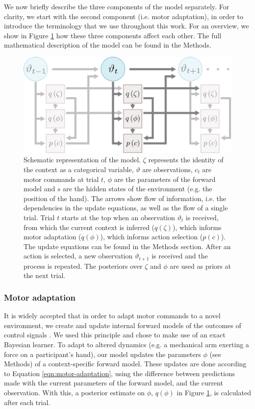 \documentclass[a4paper,doc,floatsintext,natbib]{apa6}%
\def \fref #1{Figure \ref{#1}}     %
\def \eref #1{Equation \ref{#1}}   %
\begin{document}
We now briefly describe the three components of the model separately. For clarity, we start with the second component (i.e. motor adaptation), in order to introduce the terminology that we use throughout this work. For an overview, we show in \fref{fig:model} how these three components affect each other. The full mathematical description of the model can be found in the Methods.

\begin{figure}
\centering
\includegraphics[]{./figures/figure_1.png}
\caption{Schematic representation of the model. $\zeta$ represents the identity of the context as a categorical variable, $\vartheta$ are observations, $c_t$ are motor commands at trial $t$, $\phi$ are the parameters of the forward model and $s$ are the hidden states of the environment (e.g. the position of the hand). The arrows show flow of information, i.e. the dependencies in the update equations, as well as the flow of a single trial. Trial $t$ starts at the top when an observation $\vartheta_t$ is received, from which the current context is inferred ($q(\zeta)$), which informs motor adaptation ($q(\phi)$), which informs action selection ($p(c)$). The update equations can be found in the Methods section. After an action is selected, a new observation $\vartheta_{t+1}$ is received and the process is repeated. The posteriors over $\zeta$ and $\phi$ are used as priors at the next trial.}
\label{fig:model}
\end{figure}

\subsubsection{Motor adaptation}
It is widely accepted that in order to adapt motor commands to a novel environment, we create and update internal forward models of the outcomes of control signals \citep{Wolpert_Multiple_1998}. We used this principle and chose to make use of an exact Bayesian learner. To adapt to altered dynamics (e.g. a mechanical arm exerting a force on a participant's hand), our model updates the parameters $\phi$ (see Methods) of a context-specific forward model. These updates are done according to \eref{eqn:motor-adaptation}, using the difference between predictions made with the current parameters of the forward model, and the current observation. With this, a posterior estimate on $\phi$, $q(\phi)$ in \fref{fig:model}, is calculated after each trial.
\end{document}
